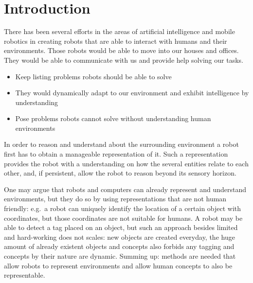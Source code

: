 \chapter{Introduction}

%

There has been several efforts in the areas of artificial intelligence and mobile robotics
in creating robots that are able to interact with humans and their environments.
Those robots would be able to move into our houses and offices. They would be able to communicate
with us and provide help solving our tasks.

\begin{itemize}
\item Keep listing problems robots should be able to solve
\item They would dynamically adapt to our environment and exhibit intelligence by understanding
\item Pose problems robots cannot solve without understanding human environments
\end{itemize}


In order to reason and understand about the surrounding environment a robot first has to
obtain a manageable representation of it.
Such a representation provides the robot with a understanding on how the several
entities relate to each other, and, if persistent, allow the robot to reason beyond its sensory
horizon.

One may argue that robots and computers can already represent and understand environments, but they
do so by using representations that are not human friendly: e.g.\ a robot can uniquely identify the
location of a certain object with coordinates, but those coordinates are not suitable for humans.
A robot may be able to detect a tag placed on an object, but such an approach besides limited
and hard-working does not scales: new objects are created everyday, the huge amount of already
existent objects and concepts also forbids any tagging and concepts by their nature are dynamic.
Summing up: methods are needed that allow robots to represent environments and allow human concepts
to also be representable.

